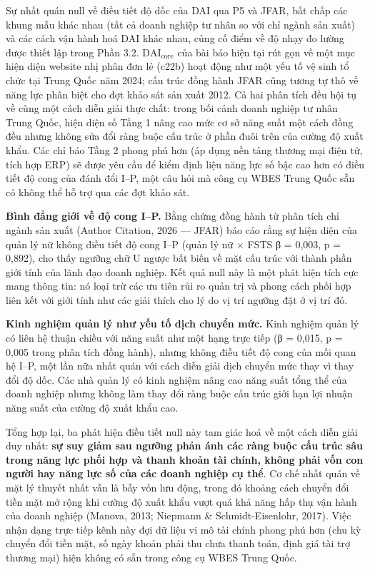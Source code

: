 \documentclass[12pt,a4paper]{article}
\begin{document}
Sự nhất quán null về điều tiết độ dốc của DAI qua P5 và JFAR, bất chấp
các khung mẫu khác nhau (tất cả doanh nghiệp tư nhân so với chỉ ngành
sản xuất) và các cách vận hành hoá DAI khác nhau, củng cố điểm về độ
nhạy đo lường được thiết lập trong Phần 3.2.
\(\mathrm{DAI}_{\text{core}}\) của bài báo hiện tại rút gọn về một mục
hiện diện website nhị phân đơn lẻ (c22b) hoạt động như một yếu tố vệ
sinh tổ chức tại Trung Quốc năm 2024; cấu trúc đồng hành JFAR cũng tương
tự thô về năng lực phân biệt cho đợt khảo sát sản xuất 2012. Cả hai phân
tích đều hội tụ về cùng một cách diễn giải thực chất: trong bối cảnh
doanh nghiệp tư nhân Trung Quốc, hiện diện số Tầng 1 nâng cao mức cơ sở
năng suất một cách đồng đều nhưng không sửa đổi ràng buộc cấu trúc ở
phần đuôi trên của cường độ xuất khẩu. Các chỉ báo Tầng 2 phong phú hơn
(áp dụng nền tảng thương mại điện tử, tích hợp ERP) sẽ được yêu cầu để
kiểm định liệu năng lực số bậc cao hơn có điều tiết độ cong của đánh đổi
I--P, một câu hỏi mà công cụ WBES Trung Quốc sẵn có không thể hỗ trợ qua
các đợt khảo sát.

\textbf{Bình đẳng giới về độ cong I--P.} Bằng chứng đồng hành từ phân
tích chỉ ngành sản xuất (Author Citation, 2026 --- JFAR) báo cáo rằng sự
hiện diện của quản lý nữ không điều tiết độ cong I--P (quản lý nữ × FSTS
β = 0,003, p = 0,892), cho thấy ngưỡng chữ U ngược bất biến về mặt cấu
trúc với thành phần giới tính của lãnh đạo doanh nghiệp. Kết quả null
này là một phát hiện tích cực mang thông tin: nó loại trừ các ưu tiên
rủi ro quản trị và phong cách phối hợp liên kết với giới tính như các
giải thích cho lý do vị trí ngưỡng đặt ở vị trí đó.

\textbf{Kinh nghiệm quản lý như yếu tố dịch chuyển mức.} Kinh nghiệm
quản lý có liên hệ thuận chiều với năng suất như một hạng trực tiếp (β =
0,015, p = 0,005 trong phân tích đồng hành), nhưng không điều tiết độ
cong của mối quan hệ I--P, một lần nữa nhất quán với cách diễn giải dịch
chuyển mức thay vì thay đổi độ dốc. Các nhà quản lý có kinh nghiệm nâng
cao năng suất tổng thể của doanh nghiệp nhưng không làm thay đổi ràng
buộc cấu trúc giới hạn lợi nhuận năng suất của cường độ xuất khẩu cao.

Tổng hợp lại, ba phát hiện điều tiết null này tam giác hoá về một cách
diễn giải duy nhất: \textbf{sự suy giảm sau ngưỡng phản ánh các ràng
buộc cấu trúc sâu trong năng lực phối hợp và thanh khoản tài chính,
không phải vốn con người hay năng lực số của các doanh nghiệp cụ thể}.
Cơ chế nhất quán về mặt lý thuyết nhất vẫn là bẫy vốn lưu động, trong đó
khoảng cách chuyển đổi tiền mặt mở rộng khi cường độ xuất khẩu vượt quá
khả năng hấp thụ vận hành của doanh nghiệp (Manova, 2013; Niepmann \&
Schmidt-Eisenlohr, 2017). Việc nhận dạng trực tiếp kênh này đợi dữ liệu
vi mô tài chính phong phú hơn (chu kỳ chuyển đổi tiền mặt, số ngày khoản
phải thu chưa thanh toán, định giá tài trợ thương mại) hiện không có sẵn
trong công cụ WBES Trung Quốc.
\end{document}
